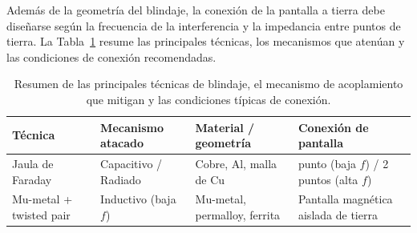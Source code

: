 \begin{marginfigure}
    \centering
    \caption[Blindaje magnético con mu-metal.]{Blindaje magnético. Un tubo de mu-metal de alta permeabilidad desvía el flujo magnético externo antes de que atraviese el bucle del par trenzado, reduciendo la tensión inducida por inductancia mutua.}\label{fig:blindaje_magnetico}
\end{marginfigure}

Además de la geometría del blindaje, la conexión de la pantalla a tierra debe diseñarse según la frecuencia de la interferencia y la impedancia entre puntos de tierra. La Tabla~\ref{tab:tecnicas_blindaje} resume las principales técnicas, los mecanismos que atenúan y las condiciones de conexión recomendadas.

\begin{table}[ht]
    \centering
    \small
    \setlength{\tabcolsep}{3pt}
    \renewcommand{\tabularxcolumn}[1]{m{#1}}
    \begin{tabularx}{\linewidth}{@{} >{\centering\arraybackslash}X >{\centering\arraybackslash}X >{\centering\arraybackslash}X >{\centering\arraybackslash}X @{}}
        \toprule
        \textbf{Técnica} & \textbf{Mecanismo atacado} & \textbf{Material / geometría} & \textbf{Conexión de pantalla} \\
        \midrule
        Jaula de Faraday & Capacitivo / Radiado & Cobre, Al, malla de Cu & 1 punto (baja $f$) / 2 puntos (alta $f$) \\
        Mu-metal + twisted pair & Inductivo (baja $f$) & Mu-metal, permalloy, ferrita & Pantalla magnética aislada de tierra \\
        \bottomrule
    \end{tabularx}
    \caption{Resumen de las principales técnicas de blindaje, el mecanismo de acoplamiento que mitigan y las condiciones típicas de conexión.\protect\label{tab:tecnicas_blindaje}}
\end{table}

